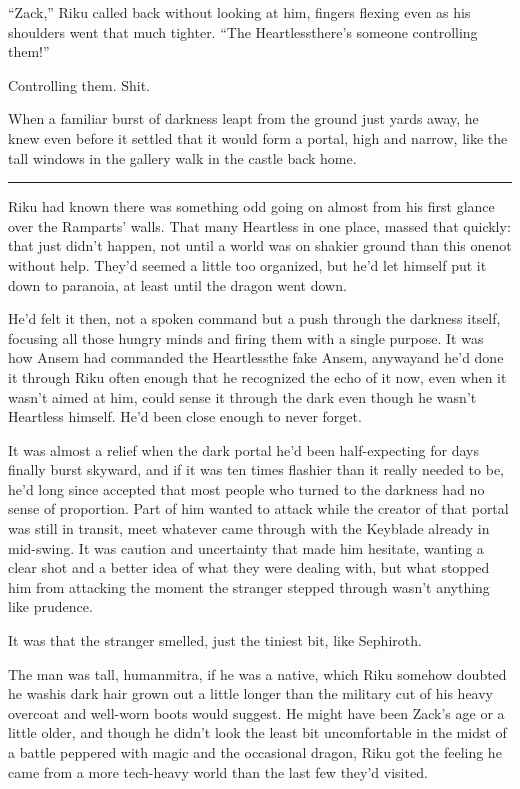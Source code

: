 ``Zack,'' Riku called back without looking at him, fingers flexing even as his shoulders went that much tighter. ``The Heartless\textemdash there's someone controlling them!''

Controlling them. Shit.

When a familiar burst of darkness leapt from the ground just yards away, he knew even before it settled that it would form a portal, high and narrow, like the tall windows in the gallery walk in the castle back home.

\fancybreak{\pfbreakdisplay}


Riku had known there was something odd going on almost from his first glance over the Ramparts' walls. That many Heartless in one place, massed that quickly: that just didn't happen, not until a world was on shakier ground than this one\textemdash not without help. They'd seemed a little too organized, but he'd let himself put it down to paranoia, at least until the dragon went down.

He'd felt it then, not a spoken command but a push through the darkness itself, focusing all those hungry minds and firing them with a single purpose. It was how Ansem had commanded the Heartless\textemdash the fake Ansem, anyway\textemdash and he'd done it through Riku often enough that he recognized the echo of it now, even when it wasn't aimed at him, could sense it through the dark even though he wasn't Heartless himself. He'd been close enough to never forget.

It was almost a relief when the dark portal he'd been half-expecting for days finally burst skyward, and if it was ten times flashier than it really needed to be, he'd long since accepted that most people who turned to the darkness had no sense of proportion. Part of him wanted to attack while the creator of that portal was still in transit, meet whatever came through with the Keyblade already in mid-swing. It was caution and uncertainty that made him hesitate, wanting a clear shot and a better idea of what they were dealing with, but what stopped him from attacking the moment the stranger stepped through wasn't anything like prudence.

It was that the stranger smelled, just the tiniest bit, like Sephiroth.

The man was tall, human\textemdash mitra, if he was a native, which Riku somehow doubted he was\textemdash his dark hair grown out a little longer than the military cut of his heavy overcoat and well-worn boots would suggest. He might have been Zack's age or a little older, and though he didn't look the least bit uncomfortable in the midst of a battle peppered with magic and the occasional dragon, Riku got the feeling he came from a more tech-heavy world than the last few they'd visited.


